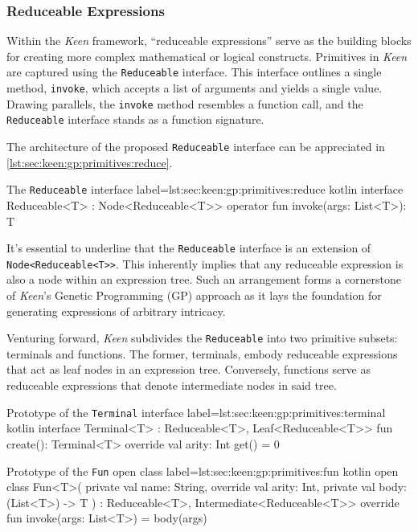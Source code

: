 \subsubsection{Reduceable Expressions}
  Within the \textit{Keen} framework, \enquote{reduceable expressions} serve as
  the building blocks for creating more complex mathematical or logical 
  constructs. Primitives in \textit{Keen} are captured using the 
  \texttt{Reduceable} interface. This interface outlines a single method, 
  \texttt{invoke}, which accepts a list of arguments and yields a single 
  value. Drawing parallels, the \texttt{invoke} method resembles a function 
  call, and the \texttt{Reduceable} interface stands as a function signature.

  The architecture of the proposed \texttt{Reduceable} interface can be 
  appreciated in \vref{lst:sec:keen:gp:primitives:reduce}.

  \begin{code}{
    The \texttt{Reduceable} interface
  }{
    label=lst:sec:keen:gp:primitives:reduce
  }{kotlin}
    interface Reduceable<T> : Node<Reduceable<T>> {
        operator fun invoke(args: List<T>): T
    }      
  \end{code}

  It's essential to underline that the \texttt{Reduceable} interface is an 
  extension of \texttt{Node<Reduceable<T>>}. This inherently implies that any 
  reduceable expression is also a node within an expression tree. Such an 
  arrangement forms a cornerstone of \textit{Keen}'s Genetic Programming (GP) 
  approach as it lays the foundation for generating expressions of arbitrary 
  intricacy.

  Venturing forward, \textit{Keen} subdivides the \texttt{Reduceable} into 
  two primitive subsets: terminals and functions. The former, terminals, 
  embody reduceable expressions that act as leaf nodes in an expression tree. 
  Conversely, functions serve as reduceable expressions that denote 
  intermediate nodes in said tree.

  \begin{code}{Prototype of the \texttt{Terminal} interface}{
    label=lst:sec:keen:gp:primitives:terminal
  }{kotlin}
    interface Terminal<T> : Reduceable<T>, Leaf<Reduceable<T>> {
        fun create(): Terminal<T>
        override val arity: Int
            get() = 0
    }
  \end{code}

  \begin{code}{Prototype of the \texttt{Fun} open class}{
    label=lst:sec:keen:gp:primitives:fun
  }{kotlin}
    open class Fun<T>(
        private val name: String,
        override val arity: Int,
        private val body: (List<T>) -> T
    ) : Reduceable<T>, Intermediate<Reduceable<T>> {
        override fun invoke(args: List<T>) = body(args)
    }
  \end{code}

